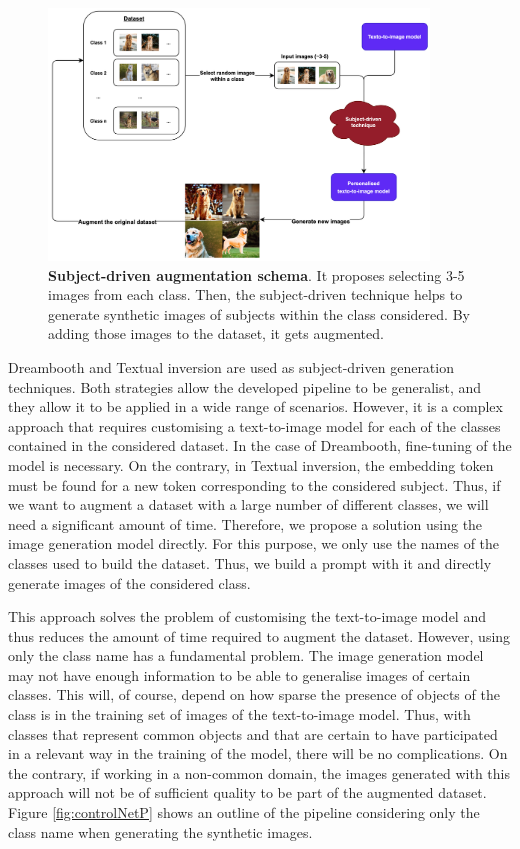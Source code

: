 \begin{figure}
    \centering
    \includegraphics[width=0.9\textwidth]{Pictures/subjectDrivenP.png} 
    \caption{\textbf{Subject-driven augmentation schema}.  It proposes selecting 3-5 images from each class. Then, the subject-driven technique helps to generate synthetic images of subjects within the class considered. By adding those images to the dataset, it gets augmented.}
    \label{fig:subjectDrivenP}
\end{figure}

Dreambooth and Textual inversion are used as subject-driven generation techniques. Both strategies allow the developed pipeline to be generalist, and they allow it to be applied in a wide range of scenarios. However, it is a complex approach that requires customising a text-to-image model for each of the classes contained in the considered dataset. In the case of Dreambooth, fine-tuning of the model is necessary. On the contrary, in Textual inversion, the embedding token must be found for a new token corresponding to the considered subject. Thus, if we want to augment a dataset with a large number of different classes, we will need a significant amount of time. Therefore, we propose a solution using the image generation model directly. For this purpose, we only use the names of the classes used to build the dataset. Thus, we build a prompt with it and directly generate images of the considered class.

This approach solves the problem of customising the text-to-image model and thus reduces the amount of time required to augment the dataset. However, using only the class name has a fundamental problem. The image generation model may not have enough information to be able to generalise images of certain classes. This will, of course, depend on how sparse the presence of objects of the class is in the training set of images of the text-to-image model. Thus, with classes that represent common objects and that are certain to have participated in a relevant way in the training of the model, there will be no complications. On the contrary, if working in a non-common domain, the images generated with this approach will not be of sufficient quality to be part of the augmented dataset. Figure \ref{fig:controlNetP} shows an outline of the pipeline considering only the class name when generating the synthetic images.

